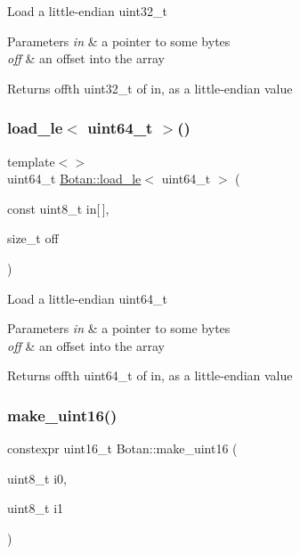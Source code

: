 Load a little-\/endian uint32\+\_\+t 
\begin{DoxyParams}{Parameters}
{\em in} & a pointer to some bytes \\
\hline
{\em off} & an offset into the array \\
\hline
\end{DoxyParams}
\begin{DoxyReturn}{Returns}
off\textquotesingle{}th uint32\+\_\+t of in, as a little-\/endian value 
\end{DoxyReturn}
\mbox{\label{namespace_botan_af8e343d945901fa17325279d27a14e39}} 
\subsubsection{\texorpdfstring{load\+\_\+le$<$ uint64\+\_\+t $>$()}{load\_le< uint64\_t >()}}
{\footnotesize\ttfamily template$<$$>$ \\
uint64\+\_\+t \hyperlink{namespace_botan_a745efa1d08234fe3b785f17c19ec26b7}{Botan\+::load\+\_\+le}$<$ uint64\+\_\+t $>$ (\begin{DoxyParamCaption}\item[{const uint8\+\_\+t}]{in\mbox{[}$\,$\mbox{]},  }\item[{size\+\_\+t}]{off }\end{DoxyParamCaption})\hspace{0.3cm}{\ttfamily [inline]}}

Load a little-\/endian uint64\+\_\+t 
\begin{DoxyParams}{Parameters}
{\em in} & a pointer to some bytes \\
\hline
{\em off} & an offset into the array \\
\hline
\end{DoxyParams}
\begin{DoxyReturn}{Returns}
off\textquotesingle{}th uint64\+\_\+t of in, as a little-\/endian value 
\end{DoxyReturn}
\mbox{\label{namespace_botan_afa1f23105ed52b51390e214db16b6900}} 
\subsubsection{\texorpdfstring{make\+\_\+uint16()}{make\_uint16()}}
{\footnotesize\ttfamily constexpr uint16\+\_\+t Botan\+::make\+\_\+uint16 (\begin{DoxyParamCaption}\item[{uint8\+\_\+t}]{i0,  }\item[{uint8\+\_\+t}]{i1 }\end{DoxyParamCaption})\hspace{0.3cm}{\ttfamily [inline]}}

